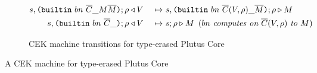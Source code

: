 \documentclass[../plutus-core-specification.tex]{subfiles}
\begin{document}
\begin{figure}[H]
\begin{subfigure}[c]{\linewidth}
\begin{minipage}{\linewidth}
\begin{alignat*}{2}
  s,\texttt{(} \texttt{builtin} ~ bn ~ \overline{C} \_ M \overline{M} \texttt{)};\rho & \triangleleft V
                                                 &~\mapsto~& s,\texttt{(} \texttt{builtin} ~ bn ~ \overline{C}(V,\rho) \_ \overline{M} \texttt{)};\rho
                                                 \triangleright M\\
  s,\texttt{(} \texttt{builtin} ~ bn ~ \overline{C} \_  \texttt{)};\rho & \triangleleft V
                                                 &~\mapsto~&  s;\rho \triangleright M
                                                 \enspace (\textit{$bn$ computes on $\overline{C}(V,\rho)$ to $M$})\\
    \end{alignat*}
\end{minipage}
    \caption{CEK machine transitions for type-erased Plutus Core}
    \label{fig:untyped-cek-transitions}
\end{subfigure}
\caption{A CEK machine for type-erased Plutus Core}
\label{fig:untyped-cek-machine}
\end{figure}

\end{document}
